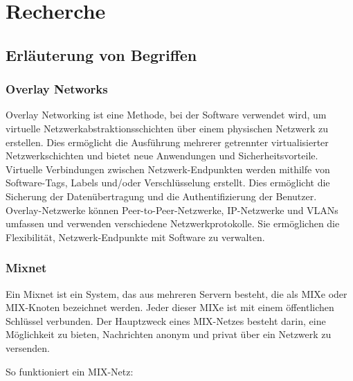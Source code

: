 \section{Recherche}

\subsection{Erläuterung von Begriffen}

\subsubsection{Overlay Networks}

Overlay Networking ist eine Methode, bei der Software verwendet wird, um virtuelle Netzwerkabstraktionsschichten über einem physischen Netzwerk zu erstellen. Dies ermöglicht die Ausführung mehrerer getrennter virtualisierter Netzwerkschichten und bietet neue Anwendungen und Sicherheitsvorteile. Virtuelle Verbindungen zwischen Netzwerk-Endpunkten werden mithilfe von Software-Tags, Labels und/oder Verschlüsselung erstellt. Dies ermöglicht die Sicherung der Datenübertragung und die Authentifizierung der Benutzer. Overlay-Netzwerke können Peer-to-Peer-Netzwerke, IP-Netzwerke und VLANs umfassen und verwenden verschiedene Netzwerkprotokolle. Sie ermöglichen die Flexibilität, Netzwerk-Endpunkte mit Software zu verwalten.\footnotemark{}

\subsubsection{Mixnet}

Ein Mixnet ist ein System, das aus mehreren Servern besteht, die als MIXe oder MIX-Knoten bezeichnet werden. Jeder dieser MIXe ist mit einem öffentlichen Schlüssel verbunden. Der Hauptzweck eines MIX-Netzes besteht darin, eine Möglichkeit zu bieten, Nachrichten anonym und privat über ein Netzwerk zu versenden.

So funktioniert ein MIX-Netz:

